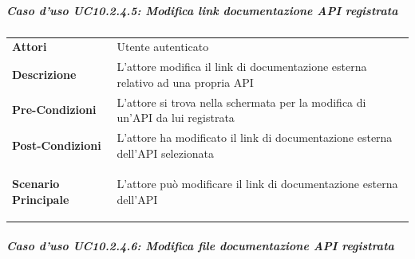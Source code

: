 \subparagraph{Caso d'uso UC10.2.4.5: Modifica link documentazione API registrata}
\label{UC10_2_4_5}

\begin{minipage}{\linewidth}
	\begin{tabular}{ l | p{11cm}}
		\hline
		\rowcolor{Gray}
		\multicolumn{2}{c}{UC10.2.4.5 - Modifica link documentazione API registrata} \\
		\hline
		\textbf{Attori} & Utente autenticato \\
		\textbf{Descrizione} & L'attore modifica il link di documentazione esterna relativo ad una propria API\\
		\textbf{Pre-Condizioni} & L'attore si trova nella schermata per la modifica di un'API da lui registrata\\
		\textbf{Post-Condizioni} & L'attore ha modificato il link di documentazione esterna dell'API selezionata \\
		\textbf{Scenario Principale} & 
		\begin{enumerate*}[label=(\arabic*.),itemjoin={\newline}]
			\item L'attore può modificare il link di documentazione esterna dell'API
		\end{enumerate*}\\
	\end{tabular}
\end{minipage}

\subparagraph{Caso d'uso UC10.2.4.6: Modifica file documentazione API registrata}
\label{UC10_2_4_6}

